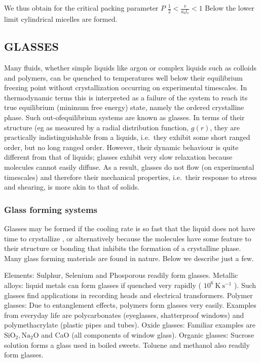 \documentclass[
  letterpaper,
  DIV=11,
  numbers=noendperiod]{scrartcl}
\begin{document}
We thus obtain for the critical packing parameter \(P\)
\(\frac{1}{2}<\frac{v}{a_{0} l_{c}}<1\) Below the lower limit
cylindrical micelles are formed.

\subsection{GLASSES}\label{glasses}

Many fluids, whether simple liquids like argon or complex liquids such
as colloids and polymers, can be quenched to temperatures well below
their equilibrium freezing point without crystallization occurring on
experimental timescales. In thermodynamic terms this is interpreted as a
failure of the system to reach its true equilibrium (minimum free
energy) state, namely the ordered crystalline phase. Such
out-ofequilibrium systems are known as glasses. In terms of their
structure (eg as measured by a radial distribution function, \(g(r)\),
they are practically indistinguishable from a liquids, i.e.~they exhibit
some short ranged order, but no long ranged order. However, their
dynamic behaviour is quite different from that of liquids; glasses
exhibit very slow relaxation because molecules cannot easily diffuse. As
a result, glasses do not flow (on experimental timescales) and therefore
their mechanical properties, i.e.~their response to stress and shearing,
is more akin to that of solids.

\subsubsection{Glass forming systems}\label{glass-forming-systems}

Glasses may be formed if the cooling rate is so fast that the liquid
does not have time to crystallize , or alternatively because the
molecules have some feature to their structure or bonding that inhibits
the formation of a crystalline phase. Many glass forming materials are
found in nature. Below we describe just a few.

Elements: Sulphur, Selenium and Phosporous readily form glasses.
Metallic alloys: liquid metals can form glasses if quenched very rapidly
( \(10^{6} \mathrm{~K} \mathrm{~s}^{-1}\) ). Such glasses find
applications in recording heads and electrical transformers. Polymer
glasses: Due to entanglement effects, polymers form glasses very easily.
Examples from everyday life are polycarbonates (eyeglasses, shatterproof
windows) and polymethacrylate (plastic pipes and tubes). Oxide glasses:
Familiar examples are \(\mathrm{SiO}_{2}, \mathrm{Na}_{2} \mathrm{O}\)
and CaO (all components of window glass). Organic glasses: Sucrose
solution forms a glass used in boiled sweets. Toluene and methanol also
readily form glasses.
\end{document}
